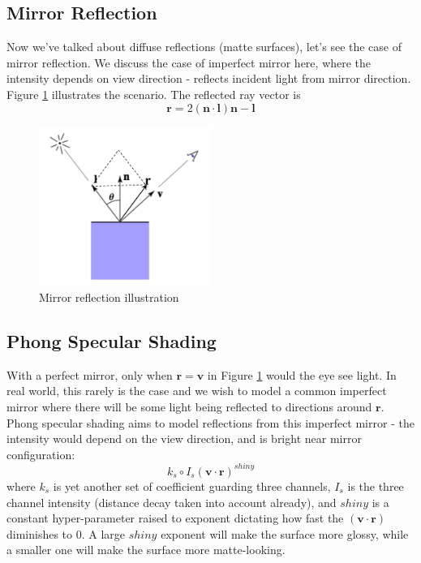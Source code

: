\documentclass[11pt]{article}
\newcommand{\bl}{\mathbf{l}}
\newcommand{\bn}{\mathbf{n}}
\newcommand{\br}{\mathbf{r}}
\newcommand{\bv}{\mathbf{v}}
\begin{document}
\subsection{Mirror Reflection}
Now we've talked about diffuse reflections (matte surfaces), let's see the case of mirror reflection. We discuss the case of imperfect mirror here, where the intensity depends on view direction - reflects incident light from mirror direction. Figure \ref{mirror reflection} illustrates the scenario. The reflected ray vector is 
\begin{equation}
	\br = 2 (\bn \cdot \bl) \bn - \bl
\end{equation}
\begin{figure}
	\centering \includegraphics[width=0.5\textwidth]{figs/mirror reflection}
	\caption{\label{mirror reflection} Mirror reflection illustration}
\end{figure}

\subsection{Phong Specular Shading}
With a perfect mirror, only when $\br = \bv$ in Figure \ref{mirror reflection} would the eye see light. In real world, this rarely is the case and we wish to model a common imperfect mirror where there will be some light being reflected to directions around $\br$. Phong specular shading aims to model reflections from this imperfect mirror - the intensity would depend on the view direction, and is bright near mirror configuration: 
\begin{equation}
	k_s \circ I_s (\bv \cdot \br)^{shiny}
\end{equation}
where $k_s$ is yet another set of coefficient guarding three channels, $I_s$ is the three channel intensity (distance decay taken into account already), and $shiny$ is a constant hyper-parameter raised to exponent dictating how fast the $(\bv \cdot \br)$ diminishes to $0$. A large $shiny$ exponent will make the surface more glossy, while a smaller one will make the surface more matte-looking. 
\end{document}
